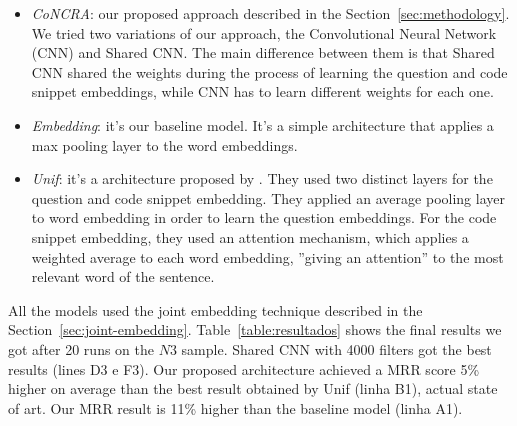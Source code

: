 \documentclass[sigconf]{acmart}
\begin{document}
\begin{itemize}
    \item \emph{CoNCRA}: our proposed approach described in the Section~\ref{sec:methodology}. We tried two variations of our approach, the Convolutional Neural Network (CNN) and Shared CNN. The main difference between them is that Shared CNN shared the weights during the process of learning the question and code snippet embeddings, while CNN has to learn different weights for each one.
    \item \emph{Embedding}: it's our baseline model. It's a simple architecture that applies a max pooling layer to the word embeddings. 
    \item \emph{Unif}: it's a architecture proposed by \cite{cambronero-deep-code-search-2019}. They used two distinct layers for the question and code snippet embedding. They applied an average pooling layer to word embedding in order to learn the question embeddings. For the code snippet embedding, they used an attention mechanism, which applies a weighted average to each word embedding, ''giving an attention'' to the most relevant word of the sentence.
\end{itemize}

All the models used the joint embedding technique described in the Section~\ref{sec:joint-embedding}. Table~\ref{table:resultados} shows the final results we got after 20 runs on the $N3$ sample. Shared CNN with 4000 filters got the best results (lines D3 e F3). Our proposed architecture achieved a MRR score 5\% higher on average than the best result obtained by Unif (linha B1), actual state of art. Our MRR result is 11\% higher than the baseline model (linha A1). 
\end{document}
